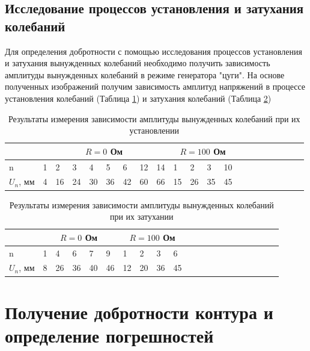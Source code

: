 \documentclass[10pt,a4paper]{article}
\begin{document}
	\subsection{Исследование процессов установления и затухания колебаний}
	
	Для определения добротности с помощью исследования процессов установления и затухания вынужденных колебаний необходимо получить зависимость амплитуды вынужденных колебаний в режиме генератора "цуги".
	На основе полученных изображений получим зависимость амплитуд напряжений в процессе установления колебаний (Таблица \ref{tab:Q_measuring_on_grown}) и затухания колебаний (Таблица \ref{tab:Q_measuring_on_decrease})
	
	\begin{table}[h!]
\centering
\begin{tabular}{|l|l|l|l|l|l|l|l|l|l|l|l|l|l|l|l|l|l|l|l|l|}
\hline
 & \multicolumn{8}{|c|}{$R = 0$ Ом} & \multicolumn{4}{|c|}{$R = 100$ Ом} \\ \hline
n            & 1 & 2   & 3   & 4   & 5   & 6   & 12 & 14 & 1  & 2    & 3   & 10  \\ \hline
$U_{n}$, мм & 4 & 16 & 24 & 30 & 36 & 42 & 60 & 66 & 15 & 26 & 35 & 45  \\ \hline
\end{tabular}
\caption{Результаты измерения зависимости амплитуды вынужденных колебаний при их установлении}
\label{tab:Q_measuring_on_grown}
\end{table}	


\begin{table}[h!]
\centering
\begin{tabular}{|l|l|l|l|l|l|l|l|l|l|l|l|l|l|l|l|l|l|l|l|l|}
\hline
& \multicolumn{5}{|c|}{$R = 0$ Ом} & \multicolumn{4}{|c|}{$R = 100$ Ом} \\ \hline
n            & 1 & 4   & 6   & 7  & 9    & 1   & 2   & 3   & 6\\ \hline
$U_{n}$, мм & 8 & 26 & 36 & 40 & 46 & 12 & 20 & 36 & 45\\ \hline
\end{tabular}
\caption{Результаты измерения зависимости амплитуды вынужденных колебаний при их затухании}
\label{tab:Q_measuring_on_decrease}
\end{table}

	\section{Получение добротности контура и определение погрешностей}
	
\end{document}
